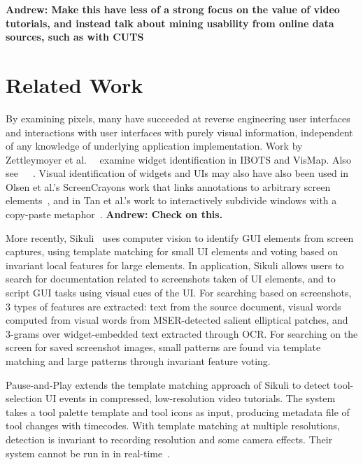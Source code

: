 \documentclass[10pt]{article}
\begin{document}
\textbf{Andrew: Make this have less of a strong focus on the value of video tutorials, and instead
talk about mining usability from online data sources, such as with CUTS}


\section{Related Work}

By examining pixels, many have succeeded at reverse engineering user interfaces
and interactions with user interfaces with purely visual information, independent
of any knowledge of underlying application implementation. Work 
by Zettleymoyer et al.~\cite{zettlemoyer_ibots_1999}~\cite{zettlemoyer_visual_1999}
examine widget identification in IBOTS and VisMap.  Also see~\cite{potter_triggers_1992}~\cite{amant_image_2005}~\cite{lieberman_visual_2001}. 
Visual identification of widgets and UIs may also have also been used in Olsen 
et al.'s ScreenCrayons work that links annotations to arbitrary screen 
elements~\cite{olsen_jr_implementing_1999},
and in Tan et al.'s work to interactively subdivide windows with a 
copy-paste metaphor~\cite{tan_wincuts_2004}.
\textbf{Andrew: Check on this.}

More recently, Sikuli~\cite{yeh_sikuli_2009} uses computer vision to 
identify GUI elements from screen captures, using template matching for small
UI elements and voting based on invariant local features for large elements.
In application, Sikuli allows users to search for documentation related to
screenshots taken of UI elements, and to script GUI tasks using visual
cues of the UI.  For searching based on screenshots, 3 types of features are 
extracted: text from the source document, visual words computed from visual 
words from MSER-detected salient elliptical patches, and 3-grams over widget-embedded 
text extracted through OCR.  For searching on the screen for saved 
screenshot images, small patterns are found via template matching and large 
patterns through invariant feature voting.

Pause-and-Play extends the template matching approach of Sikuli to detect 
tool-selection UI events in compressed, low-resolution video tutorials.  
The system takes a tool palette template and tool icons as input, 
producing metadata file of tool changes with timecodes.  With template 
matching at multiple resolutions, detection is invariant to recording 
resolution and some camera effects.  Their system cannot be run in in 
real-time~\cite{pongnumkul_pause-and-play_2011}.
\end{document}

